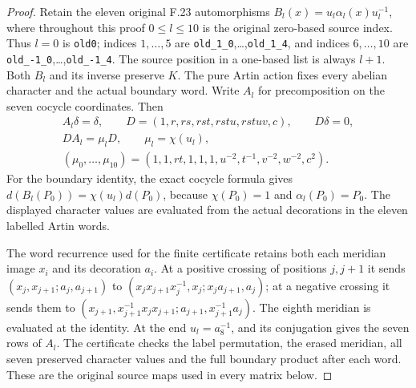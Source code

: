 \begin{proof}
Retain the eleven original F.23 automorphisms
$B_l(x)=u_l\alpha_l(x)u_l^{-1}$,
where throughout this proof $0\leq l\leq10$
is the original zero-based source index.
Thus $l=0$ is \texttt{old0}; indices $1,\ldots,5$
are \texttt{old\_1\_0},\ldots,\texttt{old\_1\_4},
and indices $6,\ldots,10$ are
\texttt{old\_-1\_0},\ldots,\texttt{old\_-1\_4}.
The source position in a one-based list is
always $l+1$.
Both $B_l$ and its inverse preserve $K$.
The pure Artin action fixes every abelian
character and the actual boundary word.
Write $A_l$ for precomposition on the seven
cocycle coordinates. Then
\[
 \begin{gathered}
 A_l\delta=\delta,\qquad
 D=(1,r,rs,rst,rstu,rstuv,c),\qquad D\delta=0,\\
 DA_l=\mu_lD,\qquad \mu_l=\chi(u_l),\\
 (\mu_0,\ldots,\mu_{10})=
 (1,1,rt,1,1,1,u^{-2},t^{-1},v^{-2},w^{-2},c^2).
 \end{gathered}                                                \tag{F.31.5}
\]
For the boundary identity, the exact cocycle
formula gives
$d(B_l(P_0))=\chi(u_l)d(P_0)$,
because $\chi(P_0)=1$ and $\alpha_l(P_0)=P_0$.
The displayed character values are evaluated
from the actual decorations in the eleven
labelled Artin words.

The word recurrence used for the finite
certificate retains both each meridian
image $x_i$ and its decoration $a_i$.
At a positive crossing of positions $j,j+1$ it sends
$(x_j,x_{j+1};a_j,a_{j+1})$ to
$(x_jx_{j+1}x_j^{-1},x_j;x_ja_{j+1},a_j)$;
at a negative crossing it sends them to
$(x_{j+1},x_{j+1}^{-1}x_jx_{j+1};
 a_{j+1},x_{j+1}^{-1}a_j)$.
The eighth meridian is evaluated at the
identity. At the end $u_l=a_8^{-1}$,
and its conjugation gives the seven rows
of $A_l$. The certificate checks the
label permutation, the erased meridian,
all seven preserved character values and
the full boundary product after each word.
These are the original source maps used
in every matrix below.


\end{proof}
